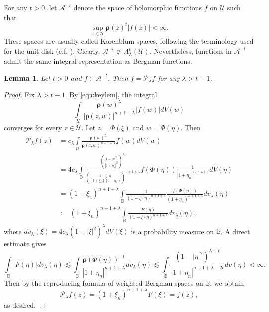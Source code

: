 \documentclass{amsart}
\newtheorem{lemma}[theorem]{Lemma}
\numberwithin{equation}{section}
\newcommand{\ball}{\mathbb{B}}
\newcommand{\calU}{\mathcal{U}}
\newcommand{\bfrho}{\boldsymbol{\rho}}
\begin{document}
For any $t>0$, let $\mathcal{A}^{-t}$ denote the space of holomorphic functions $f$ on $\calU$ such that 
\[
\sup_{z\in\calU} \bfrho(z)^t |f(z)|<\infty.
\]
These spaces are usually called Korenblum spaces, following the terminology used for the unit disk (c.f. \cite{HKZ20}).
Clearly, $\mathcal{A}^{-t}\not\subset A_\lambda^p(\calU)$.
Nevertheless, functions in $\mathcal{A}^{-t}$ admit the same integral representation as Bergman functions.

\begin{lemma}\label{lem:Bek83}
Let $t>0$ and $f\in\mathcal{A}^{-t}$. Then $f=\mathcal{P}_{\lambda}f$ for any $\lambda> t-1$.
\end{lemma}
\begin{proof}
Fix $\lambda> t-1$. By \eqref{eqn:keylem}, the integral 
\[
\int\limits_{\calU} \frac{\bfrho(w)^{\lambda}}{|\bfrho(z,w)|^{n+1+\lambda}} |f(w)| dV(w)
\]
converges for every $z\in\calU$. 
Let $z=\Phi(\xi)$ and $w=\Phi(\eta)$. Then
\begin{align*}
\mathcal{P}_{\lambda}f(z)&=c_{\lambda} \int\limits_{\calU} \frac{\bfrho(w)^{\lambda}}{\bfrho(z,w)^{n+1+\lambda}} f(w) dV(w)\\
&=4c_{\lambda} \int\limits_{\ball} \frac{\left(\frac{1-|\eta|^2}{|1+\eta_n|^2}\right)^{\lambda}}{\left(\frac{1-\xi\cdot\overline{\eta}}{(1+\xi_n)(1+\overline{\eta}_n)}\right)^{n+1+\lambda}}
 f(\Phi(\eta)) \frac{1}{|1+\eta_n|^{2(n+1)}} dV(\eta)\\
 &=(1+\xi_n)^{n+1+\lambda}
 \int\limits_{\ball} \frac{1}{(1-\xi\cdot\overline{\eta})^{n+1+\lambda}} 
 \frac{f(\Phi(\eta))}{(1+\eta_n)^{n+1+\lambda}} dv_{\lambda}(\eta)\\
 &:=(1+\xi_n)^{n+1+\lambda}
 \int\limits_{\ball} \frac{F(\eta)}{(1-\xi\cdot\overline{\eta})^{n+1+\lambda}}  dv_{\lambda}(\eta),
\end{align*}
where $dv_{\lambda}(\xi)= 4 c_{\lambda}  (1-|\xi|^2)^{\lambda} dV(\xi)$ is a probability measure on $\ball$.
A direct estimate gives
\[
 \int\limits_{\ball} |F(\eta)| dv_{\lambda}(\eta) \lesssim  \int\limits_{\ball} \frac{\bfrho(\Phi(\eta))^{-t}}{|1+\eta_n|^{n+1+\lambda}}dv_{\lambda}(\eta) \lesssim \int\limits_{\ball}\frac{(1-|\eta|^2)^{\lambda-t}}{|1+\eta_n|^{n+1+\lambda-2t}} dv(\eta)<\infty.
\]
Then by the reproducing formula of weighted Bergman spaces on $\ball$, we obtain
\[
\mathcal{P}_{\lambda}f(z)= (1+\xi_n)^{n+1+\lambda} F(\xi) =f(z),
\]
as desired.
\end{proof}
\end{document}
